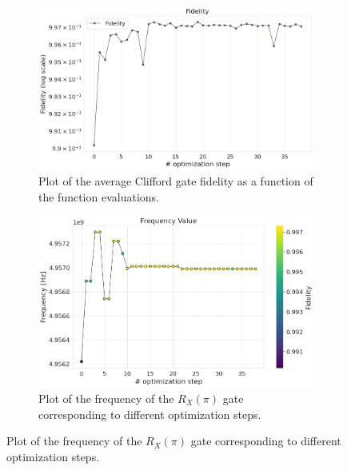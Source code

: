 \begin{figure}[h!]
    \centering
    \begin{subfigure}[t]{0.495\textwidth}
        \includegraphics[width=\textwidth]{figures/png/RB_optimization/NM/post_ft_true/NM_fid.png}
        \caption{Plot of the average Clifford gate fidelity as a function of the function evaluations.}
        \label{NM_true_fig:fidelity}
    \end{subfigure}
    \hfill
    \begin{subfigure}[t]{0.495\textwidth}
        \includegraphics[width=\textwidth]{figures/png/RB_optimization/NM/post_ft_true/frequency.png}
        \caption{Plot of the frequency of the $R_X(\pi)$ gate corresponding to different optimization steps.}
        \label{NM_true_fig:frequency}
    \end{subfigure}

    \vspace{0.5cm}


\end{figure}
